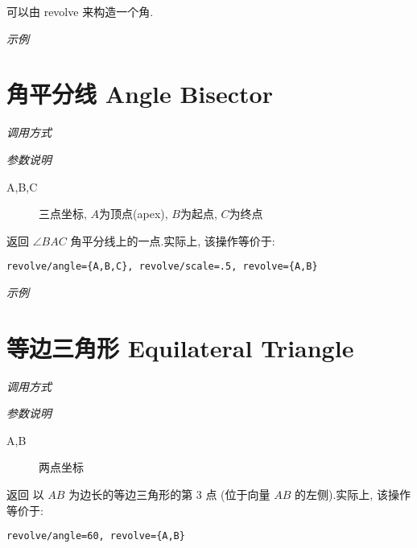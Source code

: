 可以由 revolve 来构造一个角.

\emph{示例}


\section{角平分线 Angle Bisector}

\emph{调用方式}

\begin{tcolorbox}{}
\end{tcolorbox}

\emph{参数说明}

\begin{description}
  \item[A,B,C] 三点坐标, $A$为顶点(apex), $B$为起点, $C$为终点
\end{description}

返回 $\angle{BAC}$ 角平分线上的一点.实际上, 该操作等价于:

\begin{verbatim}
revolve/angle={A,B,C}, revolve/scale=.5, revolve={A,B}
\end{verbatim}

\emph{示例}


\section{等边三角形 Equilateral Triangle}

\emph{调用方式}

\begin{tcolorbox}{}
\end{tcolorbox}

\emph{参数说明}

\begin{description}
  \item[A,B] 两点坐标
\end{description}

返回 以 $AB$ 为边长的等边三角形的第 3 点 (位于向量 $AB$ 的左侧).实际上, 该操作等价于:

\begin{verbatim}
revolve/angle=60, revolve={A,B}
\end{verbatim}

